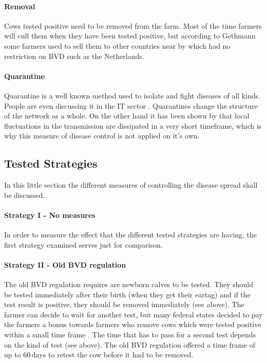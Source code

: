 \paragraph{Removal}
Cows tested positive need to be removed from the farm. Most of the time farmers will cull them when they have been tested positive, but according to Gethmann some farmers used to sell them to other countries near by which had no restriction on BVD such as the Netherlands.

\paragraph{Quarantine}
Quarantine is a well known method used to isolate and fight diseases of all kinds. People are even discussing it in the IT sector \citep{moore2003internet}. Quarantines change the structure of the network as a whole. On the other hand it has been shown by \citep{Keeling20051} that local fluctuations in the transmission are dissipated in a very short timeframe, which is why this measure of disease control is not applied on it's own.

\subsection{Tested Strategies}
In this little section the different measures of controlling the disease spread shall be discussed.
\paragraph{Strategy I - No measures}
In order to measure the effect that the different tested strategies are having, the first strategy examined serves just for comparison.
\paragraph{Strategy II - Old BVD regulation}
The old BVD regulation requires are newborn calves to be tested. They should be tested immediately after their birth (when they get their eartag) and if the test result is positive, they should be removed immediately (see above). The farmer can decide to wait for another test, but many federal states decided to pay the farmers a bonus towards farmers who remove cows which were tested positive within a small time frame \citep{personalCom}. The time that has to pass for a second test depends on the kind of test (see above). The old BVD regulation offered a time frame of up to $60\,\text{days}$ to retest the cow before it had to be removed.
